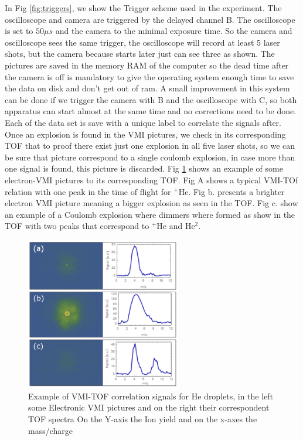 In Fig \ref{fig:triggers}, we show the Trigger scheme used in the experiment. The oscilloscope and camera are triggered by the delayed channel B. The oscilloscope is set to $50\mu s$ and the camera to the minimal exposure time. So the camera and oscilloscope sees the same trigger, the oscilloscope will record at least 5 laser shots, but the camera because starts later just can see three as shown. The pictures are saved in the memory RAM of the computer so the dead time after the camera is off is mandatory to give the operating system enough time to save the data on disk and don't get out of ram. A small improvement in this system can be done if we trigger the camera with B and the oscilloscope with C, so both apparatus can start almost at the same time and no corrections need to be done. Each of the data set is save with a unique label to correlate the signals after. Once an explosion is found in the VMI pictures, we check in its corresponding TOF that to proof there exist just one explosion in all five laser shots, so we can be sure that picture correspond to a single coulomb explosion, in case more than one signal is found, this picture is discarded. Fig \ref{fig:correlatesimg} shows an example of some electron-VMI pictures to its corresponding TOF. Fig A shows a typical VMI-TOf relation with one peak in the time of flight for $^{+}$He. Fig b. presents a brighter electron VMI picture meaning a bigger explosion as seen in the TOF. Fig c. show an example of a Coulomb explosion where dimmers where formed as show in the TOF with two peaks that correspond to $^{+}$He and He$^{2}$.

\begin{figure}[h!]
 \centering
\includegraphics[width=0.6\textwidth]{../Images/results/mir_correlated/mir_correlated.png} 
  \caption[Correlation signals example]{Example of VMI-TOF correlation signals for He droplets, in the left some Electronic VMI pictures and on the right their correspondent TOF spectra On the Y-axis the Ion yield and on the x-axes the mass/charge }
  \label{fig:correlatesimg}
 \end{figure}
  

